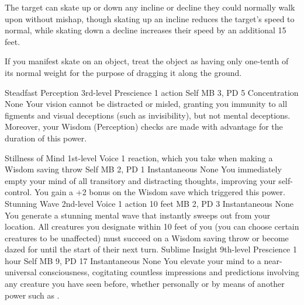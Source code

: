 The target can skate up or down any incline or decline they
could normally walk upon without mishap, though skating up
an incline reduces the target's speed to normal, while skating
down a decline increases their speed by an additional 15 feet.

If you manifest skate on an object, treat the object as having
only one-tenth of its normal weight for the purpose of dragging
it along the ground.

\DndPowerHeader%
    {Steadfast Perception\label{pwr:steadfast_perception}}
    {3rd-level Prescience}
    {1 action}
    {Self}
    {MB 3, PD 5}
    {Concentration}
    {None}
Your vision cannot be distracted or misled,
granting you immunity to all figments and visual deceptions
(such as invisibility), but not mental deceptions. Moreover,
your Wisdom (Perception) checks are made with advantage for
the duration of this power.

\DndPowerHeader%
    {Stillness of Mind\label{pwr:stillness_of_mind}}
    {1st-level Voice}
    {1 reaction, which you take when making a Wisdom saving throw}
    {Self}
    {MB 2, PD 1}
    {Instantaneous}
    {None}
You immediately empty your mind of all transitory
and distracting thoughts, improving your self-control. You
gain a +2 bonus on the Wisdom save which triggered this power.
\DndPowerHeader%
    {Stunning Wave\label{pwr:stunning_wave}}
    {2nd-level Voice}
    {1 action}
    {10 feet}
    {MB 2, PD 3}
    {Instantaneous}
    {None}
You generate a stunning mental wave that
instantly sweeps out from your location. All creatures you
designate within 10 feet of you (you can choose certain creatures
to be unaffected) must succeed on a Wisdom saving throw or
become dazed for until the start of their next turn.
\DndPowerHeader%
    {Sublime Insight\label{pwr:sublime_insight}}
    {9th-level Prescience}
    {1 hour}
    {Self}
    {MB 9, PD 17}
    {Instantaneous}
    {None}
You elevate your mind to a
near-universal consciousness,
cogitating countless impressions and predictions
involving any creature you have seen before,
whether personally or by means of another power
such as .

